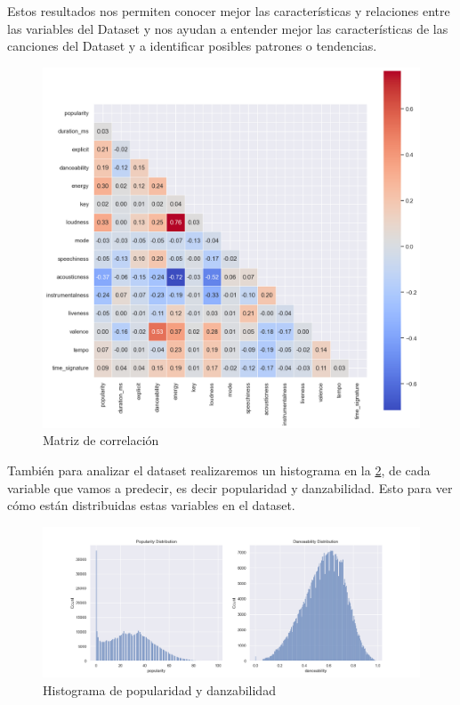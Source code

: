 \documentclass{wsdcr}
\begin{document}
Estos resultados nos permiten conocer mejor las características y relaciones entre las variables del Dataset y nos ayudan a entender mejor las características de las canciones del Dataset y a identificar posibles patrones o tendencias.

\begin{figure}[H] \includegraphics[width=\columnwidth]{images/matriz_correlacion.png} \caption{Matriz de correlación} \label{fig:matriz_correlaccion} \end{figure}

También para analizar el dataset realizaremos un histograma en la \figurename{\ref*{fig:histogramas}}, de cada variable que vamos a predecir, es decir popularidad y danzabilidad. Esto para ver cómo están distribuidas estas variables en el dataset.


\begin{figure}[H] \includegraphics[width=\columnwidth]{images/histogramas.png} \caption{Histograma de popularidad y danzabilidad} \label{fig:histogramas} \end{figure}
\end{document}
